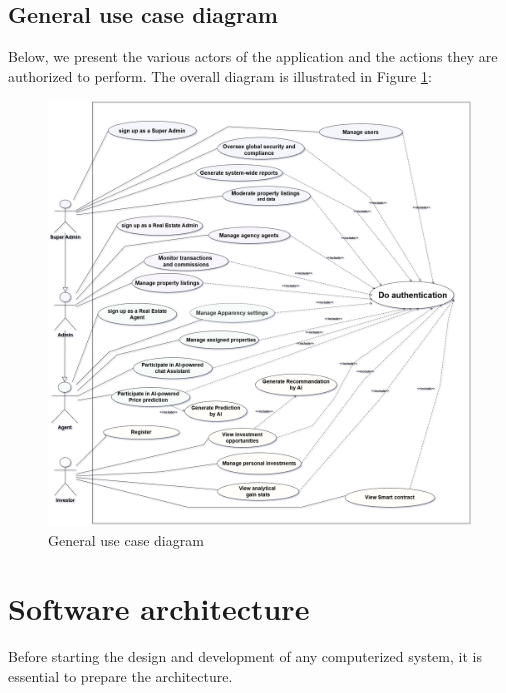 
\subsection*{General use case diagram}

Below, we present the various actors of the application and the actions they are authorized to perform.
The overall diagram is illustrated in Figure \ref{fig:use-case-diagram}:
\newpage
\begin{figure}[htbp]
    \centering
    \includegraphics[width=1.03\textwidth]{images/diagram de case d utilisation general.png}
    \caption{General use case diagram}
    \label{fig:use-case-diagram}
\end{figure}
\section{Software architecture}

Before starting the design and development of any computerized system, it is essential to prepare the architecture.

